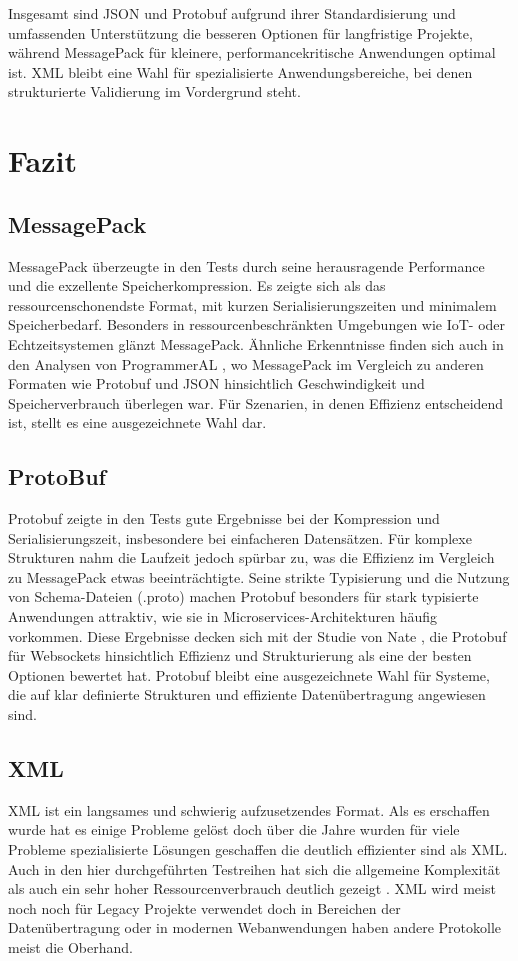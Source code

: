 \documentclass[ngerman]{seminarvorlage}
\begin{document}
Insgesamt sind JSON und Protobuf aufgrund ihrer Standardisierung und umfassenden Unterstützung die besseren Optionen für langfristige Projekte, während MessagePack für kleinere, performancekritische Anwendungen optimal ist. XML bleibt eine Wahl für spezialisierte Anwendungsbereiche, bei denen strukturierte Validierung im Vordergrund steht.


\section{Fazit}

\subsection{MessagePack}
MessagePack überzeugte in den Tests durch seine herausragende Performance und die exzellente Speicherkompression. Es zeigte sich als das ressourcenschonendste Format, mit kurzen Serialisierungszeiten und minimalem Speicherbedarf. Besonders in ressourcenbeschränkten Umgebungen wie IoT- oder Echtzeitsystemen glänzt MessagePack. Ähnliche Erkenntnisse finden sich auch in den Analysen von ProgrammerAL \cite{ProgrammerAL_SerializationBenchmarks}, wo MessagePack im Vergleich zu anderen Formaten wie Protobuf und JSON hinsichtlich Geschwindigkeit und Speicherverbrauch überlegen war. Für Szenarien, in denen Effizienz entscheidend ist, stellt es eine ausgezeichnete Wahl dar.

\subsection{ProtoBuf}
Protobuf zeigte in den Tests gute Ergebnisse bei der Kompression und Serialisierungszeit, insbesondere bei einfacheren Datensätzen. Für komplexe Strukturen nahm die Laufzeit jedoch spürbar zu, was die Effizienz im Vergleich zu MessagePack etwas beeinträchtigte. Seine strikte Typisierung und die Nutzung von Schema-Dateien (.proto) machen Protobuf besonders für stark typisierte Anwendungen attraktiv, wie sie in Microservices-Architekturen häufig vorkommen. Diese Ergebnisse decken sich mit der Studie von Nate \cite{Nate10_2024}, die Protobuf für Websockets hinsichtlich Effizienz und Strukturierung als eine der besten Optionen bewertet hat. Protobuf bleibt eine ausgezeichnete Wahl für Systeme, die auf klar definierte Strukturen und effiziente Datenübertragung angewiesen sind.

\subsection{XML}
XML ist ein langsames und schwierig aufzusetzendes Format. Als es erschaffen wurde hat es einige Probleme gelöst doch über die Jahre wurden für viele Probleme spezialisierte Lösungen geschaffen die deutlich effizienter sind als XML. Auch in den hier durchgeführten Testreihen hat sich die allgemeine Komplexität als auch ein sehr hoher Ressourcenverbrauch deutlich gezeigt \cite{Pommerenig_2019}. XML wird meist noch noch für Legacy Projekte verwendet doch in Bereichen der Datenübertragung oder in modernen Webanwendungen haben andere Protokolle meist die Oberhand.
\end{document}
